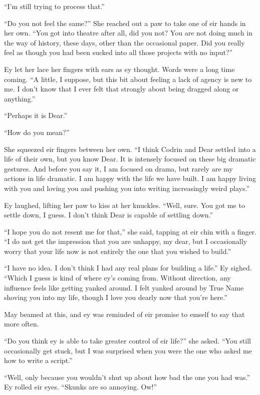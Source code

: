 ``I'm still trying to process that.''

``Do you not feel the same?'' She reached out a paw to take one of eir hands in her own. ``You got into theatre after all, did you not? You are not doing much in the way of history, these days, other than the occasional paper. Did you really feel as though you had been sucked into all those projects with no input?''

Ey let her lace her fingers with ears as ey thought. Words were a long time coming. ``A little, I suppose, but this bit about feeling a lack of agency is new to me. I don't know that I ever felt that strongly about being dragged along or anything.''

``Perhaps it is Dear.''

``How do you mean?''

She squeezed eir fingers between her own. ``I think Codrin and Dear settled into a life of their own, but you know Dear. It is intensely focused on these big dramatic gestures. And before you say it, I am focused on drama, but rarely are my actions in life dramatic. I am happy with the life we have built. I am happy living with you and loving you and pushing you into writing increasingly weird plays.''

Ey laughed, lifting her paw to kiss at her knuckles. ``Well, sure. You got me to settle down, I guess. I don't think Dear is capable of settling down.''

``I hope you do not resent me for that,'' she said, tapping at eir chin with a finger. ``I do not get the impression that you are unhappy, my dear, but I occasionally worry that your life now is not entirely the one that you wished to build.''

``I have no idea. I don't think I had any real plans for building a life.'' Ey sighed. ``Which I guess is kind of where ey's coming from. Without direction, any influence feels like getting yanked around. I felt yanked around by True Name shoving you into my life, though I love you dearly now that you're here.''

May beamed at this, and ey was reminded of eir promise to emself to say that more often.

``Do you think ey is able to take greater control of eir life?'' she asked. ``You still occasionally get stuck, but I was surprised when you were the one who asked me how to write a script.''

``Well, only because you wouldn't shut up about how bad the one you had was.'' Ey rolled eir eyes. ``Skunks are so annoying. Ow!''

